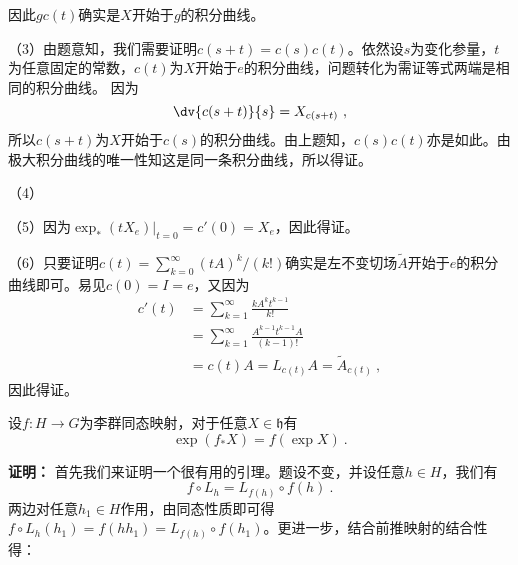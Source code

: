 因此$gc(t)$确实是$X$开始于$g$的积分曲线。


（3）由题意知，我们需要证明$c(s+t)=c(s)c(t)$。依然设$s$为变化参量，$t$为任意固定的常数，$c(t)$为$X$开始于$e$的积分曲线，问题转化为需证等式两端是相同的积分曲线。
因为
\begin{equation}
\dv{c(s+t)}{s}=X_{c(s+t)}~,
\end{equation}
所以$c(s+t)$为$X$开始于$c(s)$的积分曲线。由上题知，$c(s)c(t)$亦是如此。由极大积分曲线的唯一性知这是同一条积分曲线，所以得证。

（4）

（5）因为$\exp_*(tX_e)|_{t=0}=c'(0)=X_e$，因此得证。

（6）只要证明$c(t)=\sum^{\infty}_{k=0}(tA)^k/(k!)$确实是左不变切场$\widetilde A$开始于$e$的积分曲线即可。易见$c(0)=I=e$，又因为
\begin{equation}
\begin{aligned}
c'(t)&=\sum_{k=1}^\infty\frac{kA^kt^{k-1}}{k!}\\
&=\sum_{k=1}^\infty\frac{A^{k-1}t^{k-1}A}{(k-1)!}\\
&=c(t)A=L_{c(t)}A=\widetilde A_{c(t)}~,
\end{aligned}
\end{equation}
因此得证。

\begin{theorem}{}
设$f:H\to G$为李群同态映射，对于任意$X\in \mathfrak h$有
\begin{equation}
\exp(f_*X)=f(\exp X)~.
\end{equation}
\end{theorem}
\textbf{证明：}
首先我们来证明一个很有用的引理。题设不变，并设任意$h\in H$，我们有
\begin{equation}
f\circ L_{h}=L_{f(h)}\circ f(h)~.
\end{equation}
两边对任意$h_1\in H$作用，由同态性质即可得$f\circ L_h(h_1)=f(hh_1)=L_{f(h)}\circ f(h_1)$。更进一步，结合前推映射的结合性得：
\

